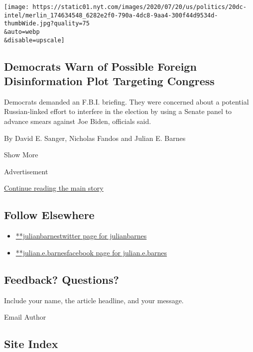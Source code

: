 \begin{enumerate}
  \texttt{[image: https://static01.nyt.com/images/2020/07/20/us/politics/20dc-intel/merlin\_174634548\_6282e2f0-790a-4dc8-9aa4-300f44d9534d-thumbWide.jpg?quality=75\\\&auto=webp\\\&disable=upscale]}

  \hypertarget{democrats-warn-of-possible-foreign-disinformation-plot-targeting-congress}{%
  \subsection{Democrats Warn of Possible Foreign Disinformation Plot
  Targeting
  Congress}\label{democrats-warn-of-possible-foreign-disinformation-plot-targeting-congress}}

  Democrats demanded an F.B.I. briefing. They were concerned about a
  potential Russian-linked effort to interfere in the election by using
  a Senate panel to advance smears against Joe Biden, officials said.

  By David E. Sanger, Nicholas Fandos and Julian E. Barnes
\end{enumerate}

Show More

Advertisement

\protect\hyperlink{after-mid2}{Continue reading the main story}

\hypertarget{follow-elsewhere}{%
\subsection{Follow Elsewhere}\label{follow-elsewhere}}

\begin{itemize}
\tightlist
\item
  \href{https://twitter.com/julianbarnes}{**julianbarnestwitter page for
  julianbarnes}
\item
  \href{https://www.facebook.com/julian.e.barnes}{**julian.e.barnesfacebook
  page for julian.e.barnes}
\end{itemize}

\hypertarget{feedback-questions}{%
\subsection{Feedback? Questions?}\label{feedback-questions}}

Include your name, the article headline, and your message.

Email Author

\hypertarget{site-index}{%
\subsection{Site Index}\label{site-index}}

